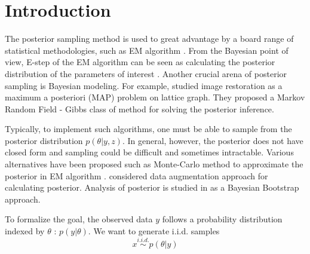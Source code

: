 \documentclass[preprint,12pt,3p]{elsarticle}
\begin{document}
\section{Introduction} %
\label{sec:introduction}

The posterior sampling method is used to great advantage by a board range of statistical methodologies, such as EM algorithm \citep{dempster1977maximum}. From the Bayesian point of view, E-step of the EM algorithm can be seen as calculating the posterior distribution of the parameters of interest \citep{Tanner_The_1987}. Another crucial arena of posterior sampling is Bayesian modeling. For example, \cite{Geman_Stochastic_1993} studied image restoration as a maximum a posteriori (MAP) problem on lattice graph. They proposed a Markov Random Field - Gibbs class of method for solving the posterior inference.

Typically, to implement such algorithms, one must be able to sample from the posterior distribution $p(\theta|y,z)$. In general, however, the posterior does not have closed form and sampling could be difficult and sometimes intractable. Various alternatives have been proposed such as Monte-Carlo method to approximate the posterior in EM algorithm \citep{Wei1990}. \cite{Tanner_The_1987} considered data augmentation approach for calculating posterior. Analysis of posterior is studied in \cite{Rubin_The_1981} as a Bayesian Bootstrap approach.

To formalize the goal, the observed data $y$ follows a probability distribution indexed by $\theta$ : $p(y | \theta)$. We want to generate i.i.d. samples
\begin{equation}
\label{eq:sample}
x\mathop \sim\limits^{i.i.d.} p(\theta |y)
\end{equation}
\end{document}
